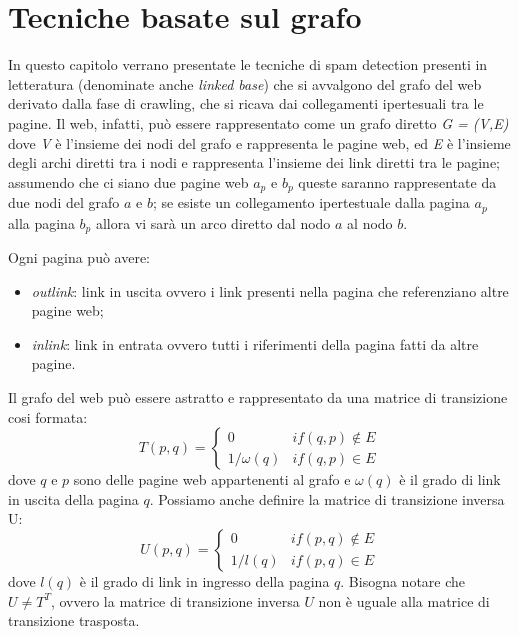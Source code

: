 \chapter{Tecniche basate sul grafo}
In questo capitolo verrano presentate le tecniche di spam detection presenti in letteratura  (denominate anche \textit{linked base}) che si avvalgono del grafo del web  derivato dalla fase di crawling, che si ricava dai collegamenti ipertesuali tra le pagine. Il web, infatti, può essere rappresentato come un grafo diretto \textit{G = (V,E)} dove \textit{V} è l'insieme dei nodi del grafo e rappresenta le pagine web, ed \textit{E} è l'insieme degli archi  diretti tra i nodi e rappresenta l'insieme dei link diretti tra le pagine; assumendo che ci siano due pagine web \(a_p\) e \(b_p\) queste saranno rappresentate da due nodi del grafo \(a\) e \(b\); se esiste un collegamento ipertestuale  dalla pagina \(a_p\) alla pagina \(b_p\) allora vi sarà un arco diretto dal nodo \(a\) al nodo \(b\). 

Ogni pagina può avere:
\begin{itemize}
 \item \textit{outlink}: link in uscita ovvero i link presenti nella pagina che referenziano altre pagine web;
 \item \textit{inlink}: link in entrata ovvero tutti i riferimenti della pagina fatti da altre pagine.
\end{itemize}

Il grafo del web può essere astratto e rappresentato da una matrice di transizione cosi formata:
\begin{equation}
T(p,q)=\left \{
\begin{array}{cc}
0 & if(q,p) \not\in E\\
1/\omega(q) & if(q,p) \in E
\end{array}
\right .
\end{equation}
dove \(q\) e \(p\) sono delle pagine web appartenenti al grafo e \(\omega(q)\) è il grado di link in uscita della pagina \(q\). 
Possiamo anche definire la matrice di transizione inversa U:
\begin{equation}
U(p,q)=\left \{
\begin{array}{cc}
0 & if(p,q) \not\in E\\
1/l(q) & if(p,q) \in E
\end{array}
\right .
\end{equation}
dove \(l(q)\) è il grado di link in ingresso della pagina \(q\). Bisogna notare che \(U \not = T^T\), ovvero la matrice di transizione inversa \(U\) non è uguale alla matrice di transizione trasposta.
